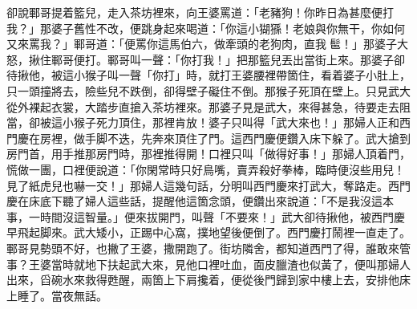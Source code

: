 卻說鄆哥提着籃兒，走入茶坊裡來，向王婆罵道：「老豬狗！你昨日為甚麼便打我？」那婆子舊性不改，便跳身起來喝道：「你這小猢猻！老娘與你無干，你如何又來罵我？」{}鄆哥道：「便罵你這馬伯六，做牽頭的老狗肉，直我𩫻䯲！」那婆子大怒，揪住鄆哥便打。鄆哥叫一聲：「你打我！」把那籃兒丟出當街上來。那婆子卻待揪他，被這小猴子叫一聲「你打」時，就打王婆腰裡帶箇住，看着婆子小肚上，只一頭撞將去，{}險些兒不跌倒，卻得壁子礙住不倒。那猴子死頂在壁上。{}只見武大從外裸起衣裳，大踏步直搶入茶坊裡來。那婆子見是武大，來得甚急，待要走去阻當，卻被這小猴子死力頂住，那裡肯放！婆子只叫得「武大來也！」那婦人正和西門慶在房裡，做手脚不迭，先奔來頂住了門。這西門慶便鑽入床下躲了。武大搶到房門首，用手推那房門時，那裡推得開！口裡只叫「做得好事！」那婦人頂着門，慌做一團，{}口裡便說道：「你閑常時只好鳥嘴，賣弄殺好拳棒，臨時便沒些用兒！見了紙虎兒也嚇一交！」那婦人這幾句話，分明叫西門慶來打武大，奪路走。西門慶在床底下聽了婦人這些話，提醒他這箇念頭，便鑽出來說道：「不是我沒這本事，一時間沒這智量。」{}便來拔開門，叫聲「不要來！」武大卻待揪他，被西門慶早飛起脚來。武大矮小，正踢中心窩，撲地望後便倒了。西門慶打鬧裡一直走了。鄆哥見勢頭不好，也撇了王婆，撒開跑了。街坊隣舍，都知道西門了得，誰敢來管事？王婆當時就地下扶起武大來，見他口裡吐血，面皮臘渣也似黃了，便叫那婦人出來，舀碗水來救得甦醒，兩箇上下肩攙着，便從後門歸到家中樓上去，安排他床上睡了。當夜無話。

